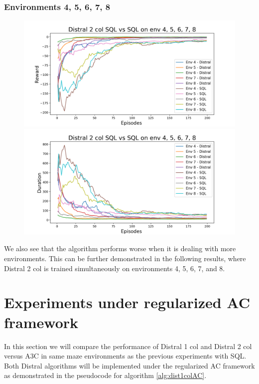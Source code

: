 \documentclass[12pt]{report}
\begin{document}
\subsubsection{Environments 4, 5, 6, 7, 8}
\begin{figure}[H]
\centering
\begin{minipage}{.5\textwidth}
\centering
\includegraphics[width=\textwidth]{figs/d2_col_sql/d2_col_sql_4_5_6_7_8_rwd.png}
\end{minipage}%
\centering
\begin{minipage}{.5\textwidth}
\centering
\includegraphics[width=\textwidth]{figs/d2_col_sql/d2_col_sql_4_5_6_7_8_dur.png}
\end{minipage}%
\end{figure}
We also see that the algorithm performs worse when it is dealing with more environments. This can be further demonstrated in the following results, where Distral 2 col is trained simultaneously on environments 4, 5, 6, 7, and 8.

\section{Experiments under regularized AC framework}

In this section we will compare the performance of Distral 1 col and Distral 2 col versus A3C in same maze environments as the previous experiments with SQL. Both Distral algorithms will be implemented under the regularized AC framework as demonstrated in the pseudocode for algorithm \ref{alg:dist1colAC}.
\end{document}
